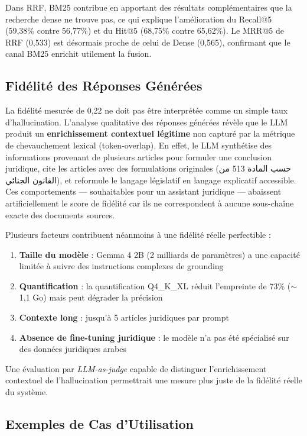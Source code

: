 Dans RRF, BM25 contribue en apportant des résultats complémentaires que la
recherche dense ne trouve pas, ce qui explique l'amélioration du Recall@5
(59,38\% contre 56,77\%) et du Hit@5 (68,75\% contre 65,62\%). Le MRR@5
de RRF (0,533) est désormais proche de celui de Dense (0,565), confirmant
que le canal BM25 enrichit utilement la fusion.

\subsection{Fidélité des Réponses Générées}

La fidélité mesurée de 0,22 ne doit pas être interprétée comme un simple taux
d'hallucination. L'analyse qualitative des réponses générées révèle que le
LLM produit un \textbf{enrichissement contextuel légitime} non capturé par
la métrique de chevauchement lexical (token-overlap). En effet, le LLM
synthétise des informations provenant de plusieurs articles pour formuler
une conclusion juridique, cite les articles avec des formulations originales
(\textarabic{حسب المادة 513 من القانون الجنائي}), et reformule le langage
législatif en langage explicatif accessible. Ces comportements — souhaitables
pour un assistant juridique — abaissent artificiellement le score de fidélité
car ils ne correspondent à aucune sous-chaîne exacte des documents sources.

Plusieurs facteurs contribuent néanmoins à une fidélité réelle perfectible :

\begin{enumerate}
    \item \textbf{Taille du modèle} : Gemma 4 2B (2 milliards de paramètres)
    a une capacité limitée à suivre des instructions complexes de grounding
    \item \textbf{Quantification} : la quantification Q4\_K\_XL réduit
    l'empreinte de 73\% ($\sim$1,1 Go) mais peut dégrader la précision
    \item \textbf{Contexte long} : jusqu'à 5 articles juridiques par prompt
    \item \textbf{Absence de fine-tuning juridique} : le modèle n'a pas été
    spécialisé sur des données juridiques arabes
\end{enumerate}

Une évaluation par \textit{LLM-as-judge} capable de distinguer
l'enrichissement contextuel de l'hallucination \cite{gao2023faithful}
permettrait une mesure plus juste de la fidélité réelle du système.

\subsection{Exemples de Cas d'Utilisation}

